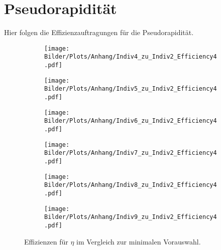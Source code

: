 \section{Pseudorapidität}\label{eta}%
Hier folgen die Effizienzauftragungen für die Pseudorapidität.
\begin{figure}
  \begin{subfigure}[t]{0.5\textwidth}
  \texttt{[image: Bilder/Plots/Anhang/Indiv4\_zu\_Indiv2\_Efficiency4.pdf]}
  \end{subfigure}
\begin{subfigure}[t]{0.5\textwidth}
 \texttt{[image: Bilder/Plots/Anhang/Indiv5\_zu\_Indiv2\_Efficiency4.pdf]}
\end{subfigure}
\begin{subfigure}[t]{0.5\textwidth}
  \texttt{[image: Bilder/Plots/Anhang/Indiv6\_zu\_Indiv2\_Efficiency4.pdf]}
\end{subfigure}
\begin{subfigure}[t]{0.5\textwidth}
  \texttt{[image: Bilder/Plots/Anhang/Indiv7\_zu\_Indiv2\_Efficiency4.pdf]}
\end{subfigure}
\begin{subfigure}[t]{0.5\textwidth}
  \texttt{[image: Bilder/Plots/Anhang/Indiv8\_zu\_Indiv2\_Efficiency4.pdf]}
\end{subfigure}
\begin{subfigure}[t]{0.5\textwidth}
  \texttt{[image: Bilder/Plots/Anhang/Indiv9\_zu\_Indiv2\_Efficiency4.pdf]}
\end{subfigure}
\caption{Effizienzen für $\eta$ im Vergleich zur minimalen Vorauswahl.}
\end{figure}
\clearpage
